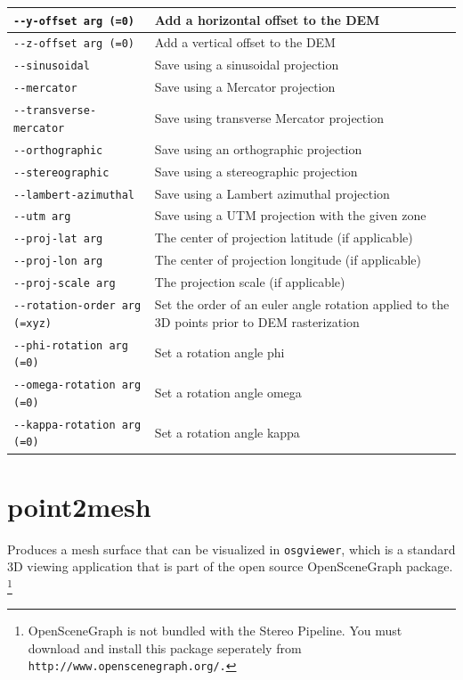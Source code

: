 \begin{longtable}{|l|p{10cm}|}
\verb#--y-offset arg (=0)# & Add a horizontal offset to the DEM \\ \hline
\verb#--z-offset arg (=0)# & Add a vertical offset to the DEM \\ \hline
\verb#--sinusoidal# & Save using a sinusoidal projection \\ \hline
\verb#--mercator# & Save using a Mercator projection \\ \hline
\verb#--transverse-mercator# & Save using transverse Mercator projection \\ \hline
\verb#--orthographic# & Save using an orthographic projection \\ \hline
\verb#--stereographic# & Save using a stereographic projection \\ \hline
\verb#--lambert-azimuthal# & Save using a Lambert azimuthal projection \\ \hline
\verb#--utm arg# & Save using a UTM projection with the given zone \\ \hline
\verb#--proj-lat arg# & The center of projection latitude (if applicable) \\ \hline
\verb#--proj-lon arg# & The center of projection longitude (if applicable) \\ \hline
\verb#--proj-scale arg# & The projection scale (if applicable) \\ \hline
\verb#--rotation-order arg (=xyz)# & Set the order of an euler angle rotation applied to the 3D points prior to DEM rasterization \\ \hline
\verb#--phi-rotation arg (=0)# & Set a rotation angle phi \\ \hline
\verb#--omega-rotation arg (=0)# & Set a rotation angle omega \\ \hline
\verb#--kappa-rotation arg (=0)# & Set a rotation angle kappa \\ \hline
\end{longtable}

\section{point2mesh}
\label{point2mesh}

Produces a mesh surface that can be visualized in {\tt osgviewer},
which is a standard 3D viewing application that is part of the open
source OpenSceneGraph package.  \footnote{OpenSceneGraph is not bundled
with the Stereo Pipeline.  You must download and install this package
seperately from {\tt http://www.openscenegraph.org/.}}

